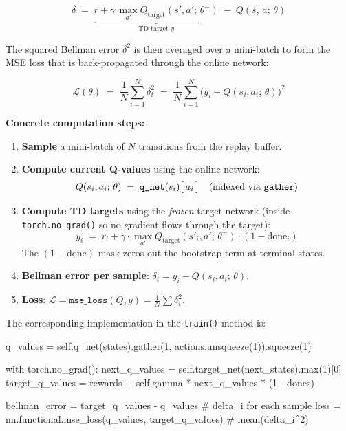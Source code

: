 \documentclass[12pt,a4paper]{report}
\begin{document}
\begin{equation}
  \delta \;=\;
  \underbrace{r + \gamma\,\max_{a'} Q_{\text{target}}(s',a';\,\theta^-)}_{\text{TD target }y}
  \;-\;
  Q(s,\,a;\,\theta)
\end{equation}

The squared Bellman error $\delta^2$ is then averaged over a mini-batch to form the MSE loss
that is back-propagated through the online network:

\begin{equation}
  \mathcal{L}(\theta) \;=\;
  \frac{1}{N}\sum_{i=1}^{N} \delta_i^2
  \;=\;
  \frac{1}{N}\sum_{i=1}^{N}
  \bigl(y_i - Q(s_i,a_i;\,\theta)\bigr)^2
\end{equation}

\textbf{Concrete computation steps:}

\begin{enumerate}[leftmargin=2em]
  \item \textbf{Sample} a mini-batch of $N$ transitions from the replay buffer.

  \item \textbf{Compute current Q-values} using the online network:
  \[
    Q(s_i, a_i;\,\theta) \;=\;
    \texttt{q\_net}(s_i)\bigl[\,a_i\,\bigr]
    \quad\text{(indexed via \texttt{gather})}
  \]

  \item \textbf{Compute TD targets} using the \emph{frozen} target network
        (inside \texttt{torch.no\_grad()} so no gradient flows through the target):
  \[
    y_i \;=\; r_i + \gamma \cdot
    \max_{a'} Q_{\text{target}}(s'_i, a';\,\theta^-)
    \cdot (1 - \text{done}_i)
  \]
  The $(1 - \text{done})$ mask zeros out the bootstrap term at terminal states.

  \item \textbf{Bellman error per sample}: $\delta_i = y_i - Q(s_i, a_i;\,\theta)$.

  \item \textbf{Loss}: $\mathcal{L} = \texttt{mse\_loss}(Q, y) = \frac{1}{N}\sum \delta_i^2$.
\end{enumerate}

The corresponding implementation in the \texttt{train()} method is:

\begin{pycode}
q_values = self.q_net(states).gather(1, actions.unsqueeze(1)).squeeze(1)

with torch.no_grad():
    next_q_values   = self.target_net(next_states).max(1)[0]
    target_q_values = rewards + self.gamma * next_q_values * (1 - dones)

bellman_error = target_q_values - q_values   # delta_i for each sample
loss = nn.functional.mse_loss(q_values, target_q_values)  # mean(delta_i^2)
\end{pycode}
\end{document}
